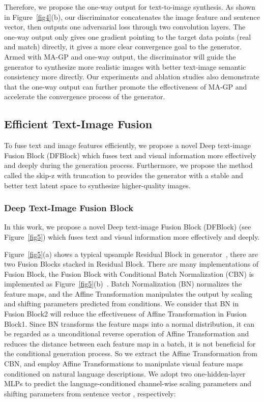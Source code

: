 \documentclass[10pt,twocolumn,letterpaper]{article}
\begin{document}
Therefore, we propose the one-way output for text-to-image synthesis. 
As shown in Figure~\ref{fig4}(b), our discriminator concatenates the image feature and sentence vector, then outputs one adversarial loss through two convolution layers. 
The one-way output only gives one gradient  pointing to the target data points (real and match) directly, it gives a more clear convergence goal to the generator. 
Armed with MA-GP and one-way output, the discriminator will guide the generator to synthesize more realistic images with better text-image semantic consistency more directly.
Our experiments and ablation studies also demonstrate that the one-way output can further promote the effectiveness of MA-GP and accelerate the convergence process of the generator. 


\subsection{Efficient Text-Image Fusion}

To fuse text and image features efficiently, we propose a novel Deep text-image Fusion Block (DFBlock) which fuses text and visual information more effectively and deeply during the generation process. 
Furthermore, we propose the method called the skip-z with truncation to provides the generator with a stable and better text latent space to synthesize higher-quality images.

\subsubsection{Deep Text-Image Fusion Block}
In this work, we propose a novel Deep text-image Fusion Block (DFBlock) (see Figure~\ref{fig5}) which fuses text and visual information more effectively and deeply. 

Figure~\ref{fig5}(a) shows a typical upsample Residual Block in generator~\cite{mescheder2018training, brock2018large}, there are two Fusion Blocks stacked in Residual Block. 
There are many implementations of Fusion Block, the Fusion Block with Conditional Batch Normalization (CBN) is implemented as Figure~\ref{fig5}(b)~\cite{yin2019semantics}. 
Batch Normalization (BN) normalizes the feature maps, and the Affine Transformation manipulates the output by scaling and shifting parameters predicted from conditions.
We consider that BN in Fusion Block2 will reduce the effectiveness of Affine Transformation in Fusion Block1. 
Since BN transforms the feature maps into a normal distribution, it can be regarded as a unconditional reverse operation of Affine Transformation and reduces the distance between each feature map in a batch, it is not beneficial for the conditional generation process.
So we extract the Affine Transformation from CBN, and employ Affine Transformations to manipulate visual feature maps conditioned on natural language descriptions.
We adopt two one-hidden-layer MLPs to predict the language-conditioned channel-wise scaling parameters  and shifting parameters  from sentence vector , respectively:
\end{document}
